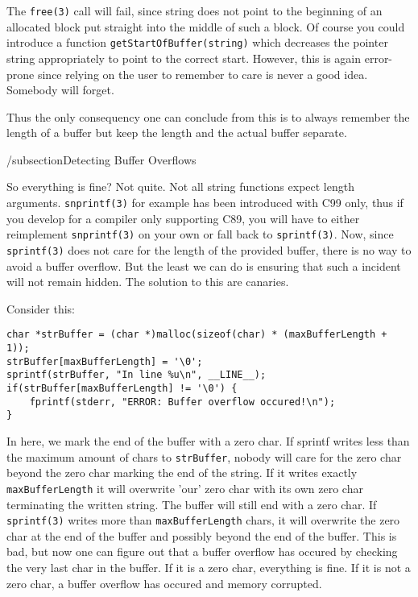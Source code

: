 The \texttt{free(3)} call will fail, since string does not point to the 
beginning of an allocated block put straight into the middle of such a block.
Of course you could introduce a function \texttt{getStartOfBuffer(string)}
which decreases the pointer string appropriately to point to the correct start.
However, this is again error-prone since relying on the user to remember
to care is never a good idea. Somebody will forget.

Thus the only consequency one can conclude from this is to always remember 
the length of a buffer but keep the length and the actual buffer separate.

/subsection{Detecting Buffer Overflows}

So everything is fine? Not quite. Not all string functions expect length
arguments. \texttt{snprintf(3)} for example has been introduced with C99 only, 
thus if you develop for a compiler only supporting C89, you will have to either
reimplement \texttt{snprintf(3)} on your own or fall back to 
\texttt{sprintf(3)}.
Now, since \texttt{sprintf(3)} does not care for the length of the provided 
buffer, there is no way to avoid a buffer overflow.
But the least we can do is ensuring that such a incident will not remain hidden.
The solution to this are canaries.

Consider this:

\begin{lstlisting}
char *strBuffer = (char *)malloc(sizeof(char) * (maxBufferLength + 1));
strBuffer[maxBufferLength] = '\0';
sprintf(strBuffer, "In line %u\n", __LINE__);
if(strBuffer[maxBufferLength] != '\0') {
    fprintf(stderr, "ERROR: Buffer overflow occured!\n");
}
\end{lstlisting}

In here, we mark the end of the buffer with a zero char.
If sprintf writes less than the maximum amount of chars to \texttt{strBuffer}, 
nobody will care for the zero char beyond the zero char marking the end of 
the string.
If it writes exactly \texttt{maxBufferLength} it will overwrite 'our' zero char 
with its own zero char terminating the written string. The buffer will still 
end with a zero char.
If \texttt{sprintf(3)} writes more than \texttt{maxBufferLength} chars, it will 
overwrite the zero char at the end of the buffer and possibly beyond the end of
the buffer.
This is bad, but now one can figure out that a buffer overflow has occured 
by checking the very last char in the buffer. 
If it is a zero char, everything is fine.
If it is not a zero char, a buffer overflow has occured and memory 
corrupted.

